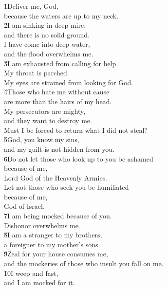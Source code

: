 \begin{poetry}
\poeml \v{1}Deliver me, God, \\
\poemll    because the waters are up to my neck. \\
\poeml \v{2}I am sinking in deep mire, \\
\poemll    and there is no solid ground. \\
\poeml I have come into deep water, \\
\poemll    and the flood overwhelms me. \\
\poeml \v{3}I am exhausted from calling for help. \\
\poemll    My throat is parched. \\
\poemlll       My eyes are strained from looking for God. \\
\poeml \v{4}Those who hate me without cause \\
\poemll    are more than the hairs of my head. \\
\poeml My persecutors are mighty, \\
\poemll    and they want to destroy me. \\
\poemlll       Must I be forced to return what I did not steal? \\
\poeml \v{5}God, you know my sins, \\
\poemll    and my guilt is not hidden from you. \\
\poeml \v{6}Do not let those who look up to you be ashamed \\
\poemll    because of me, \\
\poemlll       Lord God of the Heavenly Armies. \\
\poeml Let not those who seek you be humiliated \\
\poemll    because of me, \\
\poemlll       God of Israel. \\
\poeml \v{7}I am being mocked because of you. \\
\poemll    Dishonor overwhelms me. \\
\poeml \v{8}I am a stranger to my brothers, \\
\poemll    a foreigner to my mother's sons. \\
\poeml \v{9}Zeal for your house consumes me, \\
\poemll    and the mockeries of those who insult you fall on me. \\
\poeml \v{10}I weep and fast, \\
\poemll    and I am mocked for it. \\

\end{poetry}
